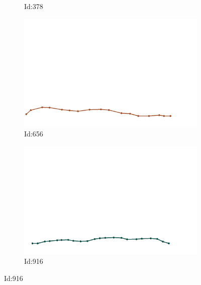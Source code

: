 \documentclass[12pt,twoside]{report}
\begin{document}
\begin{figure}
\begin{subfigure}[b]{0.20\textwidth}
\caption{Id:378}
\end{subfigure}
\begin{subfigure}[b]{0.20\textwidth}
\centering
\includegraphics[width=\textwidth]{../../trajectories/656.png}
\caption{Id:656}
\end{subfigure}
\begin{subfigure}[b]{0.20\textwidth}
\centering
\includegraphics[width=\textwidth]{../../trajectories/916.png}
\caption{Id:916}
\end{subfigure}
\end{figure}
\end{document}
